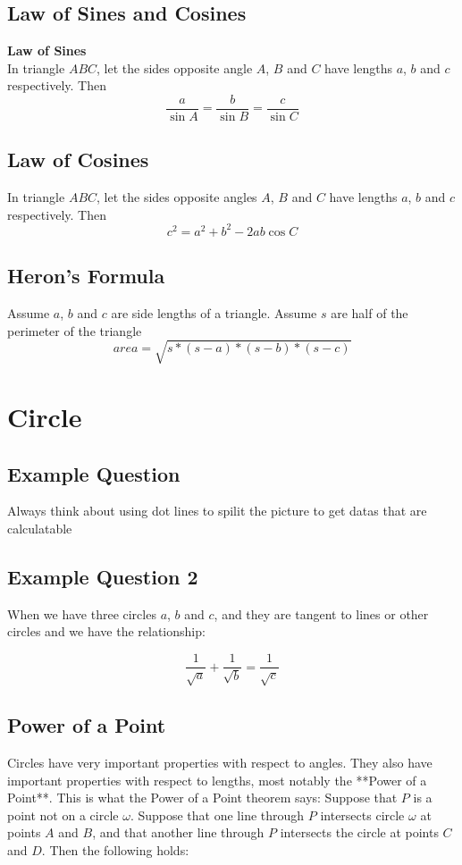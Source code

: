 \documentclass[10pt]{article}
\theoremstyle{remark}
\begin{document}
\subsection{Law of Sines and Cosines}
\textbf{Law of Sines} \\ 
In triangle $ABC$, let the sides opposite angle $A$, $B$ and $C$ have lengths $a$, $b$ and $c$
respectively. Then
\[
	\frac{a}{\sin{A}} = \frac{b}{\sin{B}} = \frac{c}{\sin{C}}
\]

\subsection{Law of Cosines}
In triangle $ABC$, let the sides opposite angles $A$, $B$ and $C$ have lengths $a$, $b$ and $c$ respectively. Then
\[
	c^2 = a^2 + b^2 - 2ab\cos{C}
\]

\subsection{Heron's Formula}
Assume $a$, $b$ and $c$ are side lengths of a triangle. Assume $s$ are half of the perimeter of the triangle
\[
	area = \sqrt{s*(s - a) * (s - b) * (s - c)}
\]
\newpage

\section{Circle}
\subsection{Example Question}
Always think about using dot lines to spilit the picture to get datas that are calculatable 

\subsection{Example Question 2}
When we have three circles $a$, $b$ and $c$, and they are tangent to lines or other circles and we have the relationship:

\[
	\frac{1}{\sqrt{a}} + \frac{1}{\sqrt{b}} = \frac{1}{\sqrt{c}}
\]

\subsection{Power of a Point}

Circles have very important properties with respect to angles. They also have important properties with respect to lengths, most notably the **Power of a Point**. \newline
This is what the Power of a Point theorem says: Suppose that $P$ is a point not on a circle $\omega$. Suppose that one line through $P$ 
intersects circle $\omega$ at points $A$ and $B$, and that another line through $P$ intersects the circle at points $C$ and $D$. Then the following holds:
\end{document}
